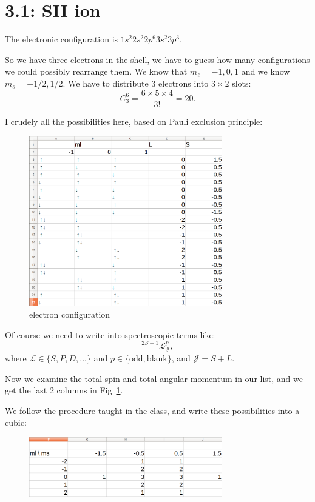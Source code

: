 \documentclass[12pt,letterpaper]{article}
\newcommand{\mt}{\mathrm}
\newcommand{\ml}{m_{\ell}}
\newcommand{\specterms}{^{2S+1}\mathcal{L}^p_\mathcal{J}}
\begin{document}
\section*{3.1: SII ion}

The electronic configuration is $1s^2 2s^2 2p^6 3s^2 3p^3$.

So we have three electrons in the shell, we have to guess how many configurations we could possibly rearrange them.
We know that $\ml = -1, 0, 1$ and we know $m_s = -1/2, 1/2$.
We have to distribute 3 electrons into $3\times 2$ slots:
\begin{equation}
    C^{6}_3 = \frac{6 \times 5 \times 4}{3!} = 20.
\end{equation}

I crudely all the possibilities here, based on Pauli exclusion principle:
\begin{figure}[h]
    \centering
    \includegraphics[width=0.75\textwidth]{images/table.png}
    \caption{electron configuration}
    \label{fig:table}    
\end{figure}

Of course we need to write into spectroscopic terms like:
\begin{equation*}
    \specterms,
\end{equation*}
where $\mathcal{L} \in \{S, P, D, ...\}$ and $p \in \{\mt{odd}, \mt{blank} \}$, and $\mathcal{J} = S + L$.

Now we examine the total spin and total angular momentum in our list, and we get the last 2 columns in Fig~\ref{fig:table}.

We follow the procedure taught in the class, and write these possibilities into a cubic:
\begin{figure}[h]
    \centering
    \includegraphics[width=0.75\textwidth]{images/cubic.png}
\end{figure}
\end{document}
